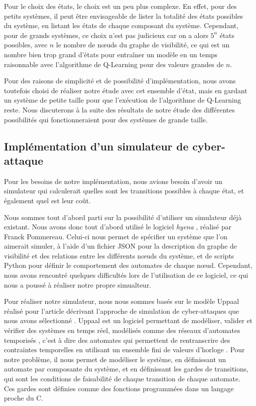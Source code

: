 \documentclass[a4paper]{article}
\begin{document}
    Pour le choix des états, le choix est un peu plus complexe.
    En effet, pour des petits systèmes, il peut être envisageable de lister la totalité des états possibles du système, en listant les états de chaque composant du système.
    Cependant, pour de grands systèmes, ce choix n'est pas judicieux car on a alors $5^n$ états possibles, avec $n$ le nombre de n\oe uds du graphe de visibilité, ce qui est un nombre bien trop grand d'états pour entraîner un modèle en un temps raisonnable avec l'algorithme de Q-Learning pour des valeurs grandes de $n$.
    
    Pour des raisons de simplicité et de possibilité d'implémentation, nous avons toutefois choisi de réaliser notre étude avec cet ensemble d'état, mais en gardant un système de petite taille pour que l'exécution de l'algorithme de Q-Learning reste.
    Nous discuterons à la suite des résultats de notre étude des différentes possibilités qui fonctionneraient pour des systèmes de grande taille.

    \subsection{Implémentation d'un simulateur de cyber-attaque}

    Pour les besoins de notre implémentation, nous avions besoin d'avoir un simulateur qui calculerait quelles sont les transitions possibles à chaque état, et également quel est leur coût.

    Nous sommes tout d'abord parti sur la possibilité d'utiliser un simulateur déjà existant.
    Nous avons donc tout d'abord utilisé le logiciel \textit{hyena} \cite{pommereau_fpomhyena_nodate}, réalisé par Franck Pommereau.
    Celui-ci nous permet de spécifier un système que l'on aimerait simuler, à l'aide d'un fichier JSON pour la description du graphe de visibilité et des relations entre les différents n\oe uds du système, et de scripts Python pour définir le comportement des automates de chaque n\oe ud.
    Cependant, nous avons rencontré quelques difficultés lors de l'utilisation de ce logiciel, ce qui nous a poussé à réaliser notre propre simualteur.

    Pour réaliser notre simulateur, nous nous sommes basés sur le modèle Uppaal réalisé pour l'article décrivant l'approche de simulation de cyber-attaques que nous avons sélectionné \cite{hutzler_automatic_2024}.
    Uppaal est un logiciel permettant de modéliser, valider et vérifier des systèmes en temps réel, modélisés comme des réseaux d'automates temporisés \cite{noauthor_httpsuppaalorg_nodate}, c'est à dire des automates qui permettent de rentranscrire des contraintes temporelles en utilisant un ensemble fini de valeurs d'horloge \cite{alur_theory_1994}.
    Pour notre problème, il nous permet de modéliser le système, en définissant un automate par composante du système, et en définissant les gardes de transitions, qui sont les conditions de faisabilité de chaque transition de chaque automate.
    Ces gardes sont définies comme des fonctions programmées dans un langage proche du C.
\end{document}
